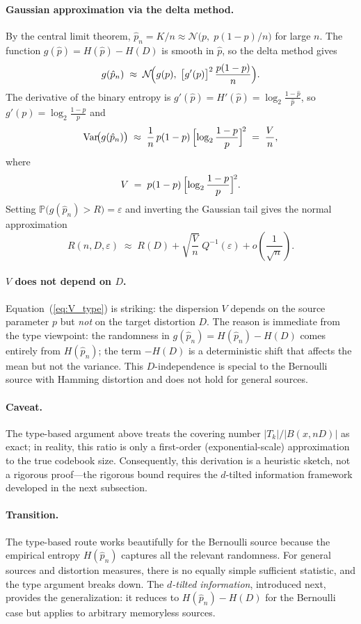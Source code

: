 \documentclass[11pt]{article}
\newcommand{\RD}{R(D)}
\newcommand{\HD}{H(D)}
\newcommand{\Var}{\mathrm{Var}}
\newcommand{\Prob}{\mathbb{P}}
\newcommand{\Qinv}{Q^{-1}}
\begin{document}
\paragraph{Gaussian approximation via the delta method.}
By the central limit theorem,
$\hat{p}_n = K/n \approx \mathcal{N}\!\bigl(p,\; p(1-p)/n\bigr)$
for large $n$.
The function $g(\hat{p}) = H(\hat{p}) - \HD$ is smooth in $\hat{p}$, so the
delta method gives
\[
g(\hat{p}_n) \;\approx\;
\mathcal{N}\!\Bigl(g(p),\;
\bigl[g'(p)\bigr]^2 \,\frac{p(1-p)}{n}\Bigr).
\]
The derivative of the binary entropy is
$g'(\hat{p}) = H'(\hat{p}) = \log_2\!\frac{1-\hat{p}}{\hat{p}}$,
so $g'(p) = \log_2\!\frac{1-p}{p}$ and
\[
\Var\!\bigl(g(\hat{p}_n)\bigr)
\;\approx\;
\frac{1}{n}\,p(1-p)\,\Bigl[\log_2\frac{1-p}{p}\Bigr]^{\!2}
\;=\; \frac{V}{n},
\]
where
\begin{equation}
\label{eq:V_type}
V \;=\; p(1-p)\,\Bigl[\log_2\frac{1-p}{p}\Bigr]^{\!2}.
\end{equation}
Setting
$\Prob\!\bigl(g(\hat{p}_n) > R\bigr) = \varepsilon$ and inverting the
Gaussian tail gives the normal approximation
\[
R(n, D, \varepsilon)
\;\approx\;
\RD + \sqrt{\frac{V}{n}}\;\Qinv(\varepsilon)
+ o\!\left(\frac{1}{\sqrt{n}}\right).
\]

\paragraph{$V$ does not depend on $D$.}
Equation~(\ref{eq:V_type}) is striking: the dispersion $V$ depends on the
source parameter $p$ but \emph{not} on the target distortion $D$.
The reason is immediate from the type viewpoint: the randomness in
$g(\hat{p}_n) = H(\hat{p}_n) - \HD$ comes entirely from $H(\hat{p}_n)$;
the term $-\HD$ is a deterministic shift that affects the mean but not the
variance.
This $D$-independence is special to the Bernoulli source with Hamming
distortion and does not hold for general sources.

\paragraph{Caveat.}
The type-based argument above treats the covering number
$|T_k|/|B(x, nD)|$ as exact;
in reality, this ratio is only a first-order (exponential-scale) approximation
to the true codebook size.
Consequently, this derivation is a heuristic sketch, not a rigorous
proof---the rigorous bound requires the $d$-tilted information framework
developed in the next subsection.

\paragraph{Transition.}
The type-based route works beautifully for the Bernoulli source because the
empirical entropy $H(\hat{p}_n)$ captures all the relevant randomness.
For general sources and distortion measures, there is no equally simple
sufficient statistic, and the type argument breaks down.
The \emph{$d$-tilted information}, introduced next, provides the
generalization: it reduces to $H(\hat{p}_n) - \HD$ for the Bernoulli case but
applies to arbitrary memoryless sources.
\end{document}
